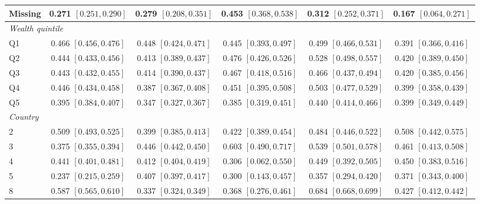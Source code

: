 \begin{landscape}
\begin{longtable}{lccccc}
Missing & 0.271 {\scriptsize$[0.251,0.290]$} & 0.279 {\scriptsize$[0.208,0.351]$} & 0.453 {\scriptsize$[0.368,0.538]$} & 0.312 {\scriptsize$[0.252,0.371]$} & 0.167 {\scriptsize$[0.064,0.271]$} \\
\midrule
\multicolumn{6}{l}{\textit{Wealth quintile}} \\
Q1 & 0.466 {\scriptsize$[0.456,0.476]$} & 0.448 {\scriptsize$[0.424,0.471]$} & 0.445 {\scriptsize$[0.393,0.497]$} & 0.499 {\scriptsize$[0.466,0.531]$} & 0.391 {\scriptsize$[0.366,0.416]$} \\
Q2 & 0.444 {\scriptsize$[0.433,0.456]$} & 0.413 {\scriptsize$[0.389,0.437]$} & 0.476 {\scriptsize$[0.426,0.526]$} & 0.528 {\scriptsize$[0.498,0.557]$} & 0.420 {\scriptsize$[0.389,0.450]$} \\
Q3 & 0.443 {\scriptsize$[0.432,0.455]$} & 0.414 {\scriptsize$[0.390,0.437]$} & 0.467 {\scriptsize$[0.418,0.516]$} & 0.466 {\scriptsize$[0.437,0.494]$} & 0.420 {\scriptsize$[0.385,0.456]$} \\
Q4 & 0.446 {\scriptsize$[0.434,0.458]$} & 0.387 {\scriptsize$[0.367,0.408]$} & 0.451 {\scriptsize$[0.395,0.508]$} & 0.503 {\scriptsize$[0.477,0.529]$} & 0.399 {\scriptsize$[0.358,0.439]$} \\
Q5 & 0.395 {\scriptsize$[0.384,0.407]$} & 0.347 {\scriptsize$[0.327,0.367]$} & 0.385 {\scriptsize$[0.319,0.451]$} & 0.440 {\scriptsize$[0.414,0.466]$} & 0.399 {\scriptsize$[0.349,0.449]$} \\
\midrule
\multicolumn{6}{l}{\textit{Country}} \\
2 & 0.509 {\scriptsize$[0.493,0.525]$} & 0.399 {\scriptsize$[0.385,0.413]$} & 0.422 {\scriptsize$[0.389,0.454]$} & 0.484 {\scriptsize$[0.446,0.522]$} & 0.508 {\scriptsize$[0.442,0.575]$} \\
3 & 0.375 {\scriptsize$[0.355,0.394]$} & 0.446 {\scriptsize$[0.442,0.450]$} & 0.603 {\scriptsize$[0.490,0.717]$} & 0.539 {\scriptsize$[0.501,0.578]$} & 0.461 {\scriptsize$[0.413,0.508]$} \\
4 & 0.441 {\scriptsize$[0.401,0.481]$} & 0.412 {\scriptsize$[0.404,0.419]$} & 0.306 {\scriptsize$[0.062,0.550]$} & 0.449 {\scriptsize$[0.392,0.505]$} & 0.450 {\scriptsize$[0.383,0.516]$} \\
5 & 0.237 {\scriptsize$[0.215,0.259]$} & 0.407 {\scriptsize$[0.397,0.417]$} & 0.300 {\scriptsize$[0.143,0.457]$} & 0.357 {\scriptsize$[0.294,0.420]$} & 0.371 {\scriptsize$[0.343,0.400]$} \\
8 & 0.587 {\scriptsize$[0.565,0.610]$} & 0.337 {\scriptsize$[0.324,0.349]$} & 0.368 {\scriptsize$[0.276,0.461]$} & 0.684 {\scriptsize$[0.668,0.699]$} & 0.427 {\scriptsize$[0.412,0.442]$} \\

\end{longtable}
\end{landscape}
